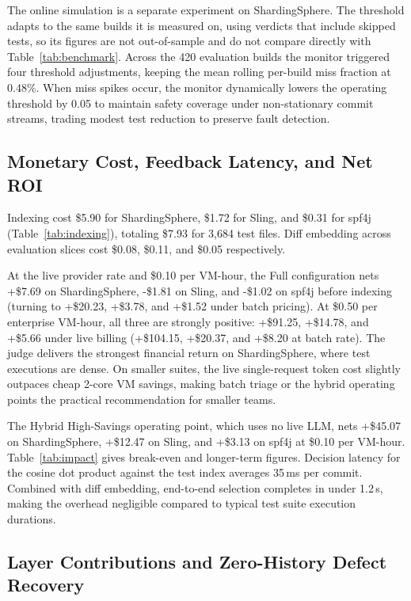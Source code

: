 The online simulation is a separate experiment on ShardingSphere. The threshold adapts to the same builds it is measured on, using verdicts that include skipped tests, so its figures are not out-of-sample and do not compare directly with Table~\ref{tab:benchmark}. Across the 420 evaluation builds the monitor triggered four threshold adjustments, keeping the mean rolling per-build miss fraction at 0.48\%. When miss spikes occur, the monitor dynamically lowers the operating threshold by 0.05 to maintain safety coverage under non-stationary commit streams, trading modest test reduction to preserve fault detection.

\subsection{Monetary Cost, Feedback Latency, and Net ROI}
\label{sec:rq3}



Indexing cost \$5.90 for ShardingSphere, \$1.72 for Sling, and \$0.31 for spf4j (Table~\ref{tab:indexing}), totaling \$7.93 for 3,684 test files. Diff embedding across evaluation slices cost \$0.08, \$0.11, and \$0.05 respectively.

At the live provider rate and \$0.10 per VM-hour, the Full configuration nets +\$7.69 on ShardingSphere, -\$1.81 on Sling, and -\$1.02 on spf4j before indexing (turning to +\$20.23, +\$3.78, and +\$1.52 under batch pricing). At \$0.50 per enterprise VM-hour, all three are strongly positive: +\$91.25, +\$14.78, and +\$5.66 under live billing (+\$104.15, +\$20.37, and +\$8.20 at batch rate). The judge delivers the strongest financial return on ShardingSphere, where test executions are dense. On smaller suites, the live single-request token cost slightly outpaces cheap 2-core VM savings, making batch triage or the hybrid operating points the practical recommendation for smaller teams.

The Hybrid High-Savings operating point, which uses no live LLM, nets +\$45.07 on ShardingSphere, +\$12.47 on Sling, and +\$3.13 on spf4j at \$0.10 per VM-hour. Table~\ref{tab:impact} gives break-even and longer-term figures. Decision latency for the cosine dot product against the test index averages 35\,ms per commit. Combined with diff embedding, end-to-end selection completes in under 1.2\,s, making the overhead negligible compared to typical test suite execution durations.

\subsection{Layer Contributions and Zero-History Defect Recovery}
\label{sec:rq4}

